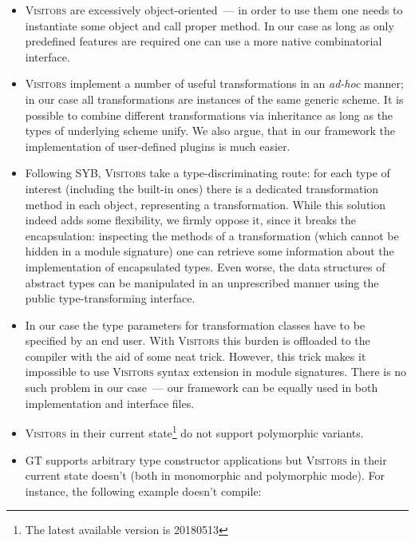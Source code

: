 \begin{itemize}
   \item \textsc{Visitors} are excessively object-oriented~--- in order to use them one needs to instantiate some object and call proper method. In our case as long as
     only predefined features are required one can use a more native combinatorial interface.
     
   \item \textsc{Visitors} implement a number of useful transformations in an \emph{ad-hoc} manner; in our case all transformations are instances of the
     same generic scheme. It is possible to combine different transformations via inheritance as long as the types of underlying scheme unify. We also argue, that
     in our framework the implementation of user-defined plugins is much easier.
     
   \item Following SYB, \textsc{Visitors} take a type-discriminating route: for each type of interest (including the built-in ones) there is a dedicated
     transformation method in each object, representing a transformation. While this solution indeed adds some flexibility, we firmly oppose it, since it
     breaks the encapsulation: inspecting the methods of a transformation (which cannot be hidden in a module signature) one can retrieve some
     information about the implementation of encapsulated types. Even worse, the data structures of abstract types can be manipulated in an unprescribed
     manner using the public type-transforming interface.

   \item In our case the type parameters for transformation classes have to be specified by an end user. With \textsc{Visitors} this burden is offloaded to the
     compiler with the aid of some neat trick. However, this trick makes it impossible to use \textsc{Visitors} syntax extension in module signatures. There is no
     such problem in our case~--- our framework can be equally used in both implementation and interface files.

   \item \textsc{Visitors} in their current state\footnote{The latest available version is 20180513} do not support polymorphic variants.
   
   \item \textsc{GT} supports arbitrary type constructor applications but \textsc{Visitors} in their current state doesn't (both in monomorphic and polymorphic mode).
     For instance, the following example doesn't compile:
     

\end{itemize}
